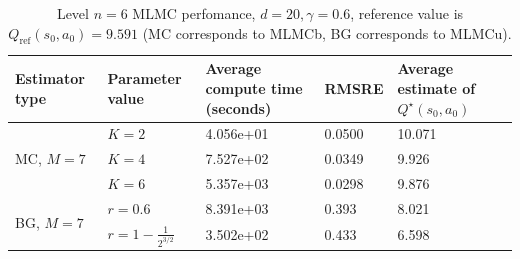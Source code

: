\documentclass[11pt]{article}
\numberwithin{equation}{section}
\theoremstyle{definition}
\theoremstyle{remark}
\begin{document}
\begin{table}[htbp]
\begin{tabular}{
p{2cm}
p{2cm}
p{3cm}
p{3cm}
p{3cm}
}
\toprule
Estimator type & Parameter value &  Average compute time (seconds) & RMSRE & Average estimate of $Q^\star(s_0,a_0)$ \\
\midrule
\multirow{3}{*}{MC, $M = 7$} & $K = 2$ & 4.056e+01 & 0.0500 & 10.071\\
 & $K = 4$ & 7.527e+02 & 0.0349 & 9.926 \\
 & $K = 6$ & 5.357e+03 & 0.0298 & 9.876\\
\midrule
\multirow{2}{*}{BG, $M = 7$} & $r = 0.6$ & 8.391e+03 & 0.393 & 8.021  \\
 & $r = 1 - \frac{1}{2^{3/2}}$ & 3.502e+02 & 0.433 & 6.598 \\
\bottomrule
\end{tabular}
\caption{Level $n=6$ MLMC perfomance, $d=20, \gamma=0.6$, reference value is $Q_{\mathrm{ref}} (s_0, a_0) = 9.591$ (MC corresponds to MLMCb, BG corresponds to MLMCu).}
\label{tab:results_gamma06}
\end{table}




\end{document}
